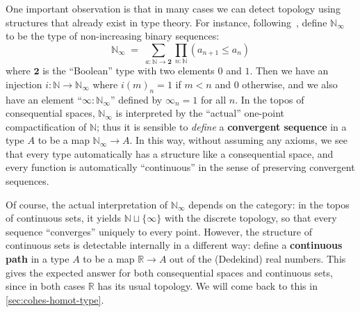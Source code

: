 \documentclass[10pt]{article}
\def\oo{\ensuremath{\infty}}
\def\N{\mathbb{N}}
\def\R{\mathbb{R}}
\def\T{\mathcal{T}}
\def\bool{\mathbf{2}}
\def\unit{\mathbf{1}}
\numberwithin{equation}{section}
\begin{document}
One important observation is that in many cases we can {detect} topology using structures that already exist in type theory.
For instance, following~\cite{es:universe-indiscrete}, define $\N_\oo$ to be the type of non-increasing binary sequences:
\[ \N_\oo \;=\; \textstyle\sum_{a:\N\to \bool} \prod_{n:\N} (a_{n+1} \le a_n) \]
where $\bool$ is the ``Boolean'' type with two elements $0$ and $1$.
Then we have an injection $i:\N\to\N_\oo$ where $i(m)_n = 1$ if $m<n$ and $0$ otherwise, and we also have an element ``$\oo:\N_\oo$'' defined by $\oo_n = 1$ for all $n$.
In the topos of consequential spaces, $\N_\oo$ is interpreted by the ``actual'' one-point compactification of $\N$; thus it is sensible to \emph{define} a \textbf{convergent sequence} in a type $A$ to be a map $\N_\oo \to A$.
In this way, without assuming any axioms, we see that every type {automatically} has a structure like a consequential space, and every function is {automatically} ``continuous'' in the sense of preserving convergent sequences.

Of course, the actual interpretation of $\N_\oo$ depends on the category: in the topos of continuous sets, it yields $\N\sqcup\{\oo\}$ with the discrete topology, so that every sequence ``converges'' uniquely to every point.
However, the structure of continuous sets is detectable internally in a different way: define a \textbf{continuous path} in a type $A$ to be a map $\R \to A$ out of the (Dedekind) real numbers.
This gives the expected answer for both consequential spaces and continuous sets, since in both cases $\R$ has its usual topology.
We will come back to this in \cref{sec:cohes-homot-type}.
\end{document}
